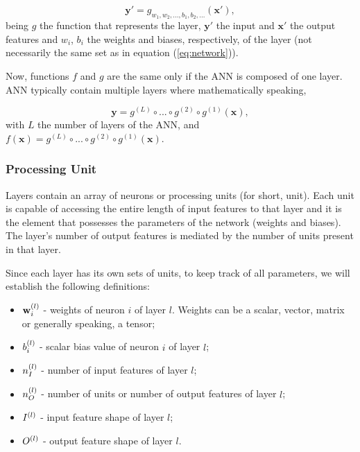 \begin{equation}
	\mathbf{y}' = g_{w_{1}, w_{2}, ..., b_{1}, b_{2}, ...}(\mathbf{x}'),
	\label{eq:layer}
\end{equation}
being $ g $ the function that represents the layer, $ \mathbf{y}' $ the input and $ \mathbf{x}' $ the output features and $ w_{i} $, $ b_{i} $ the weights and biases, respectively, of the layer (not necessarily the same set as in equation (\ref{eq:network})). 

Now, functions $ f $ and $ g $ are the same only if the \gls{ANN} is composed of one layer. \gls{ANN} typically contain multiple layers where mathematically speaking,

\begin{equation}
	\mathbf{y} = g^{(L)} \circ ... \circ g^{(2)} \circ g^{(1)}(\mathbf{x}),
	\label{eq:layer_comp_network}
\end{equation}
with $ L $ the number of layers of the \gls{ANN}, and $ f(\mathbf{x}) = g^{(L)} \circ ... \circ g^{(2)} \circ g^{(1)}(\mathbf{x}) $.


\subsubsection{Processing Unit}
Layers contain an array of neurons or processing units (for short, unit). Each unit is capable of accessing the entire length of input features to that layer and it is the element that possesses the parameters of the network (weights and biases). The layer's number of output features is mediated by the number of units present in that layer.

Since each layer has its own sets of units, to keep track of all parameters, we will establish the following definitions:

\begin{itemize}
	\item $ \mathbf{w}^{(l)}_{i} $ - weights of neuron $ i $ of layer $ l $. Weights can be a scalar, vector, matrix or generally speaking, a tensor;
	\item $ b^{(l)}_{i} $ - scalar bias value of neuron $ i $ of layer $ l $;
	\item $ n^{(l)}_{I} $ - number of input features of layer $ l $;
	\item $ n^{(l)}_{O} $ - number of units or number of output features of layer $ l $;
	\item $ I^{(l)} $ - input feature shape of layer $ l $;
	\item $ O^{(l)} $ - output feature shape of layer $ l $.
\end{itemize}

